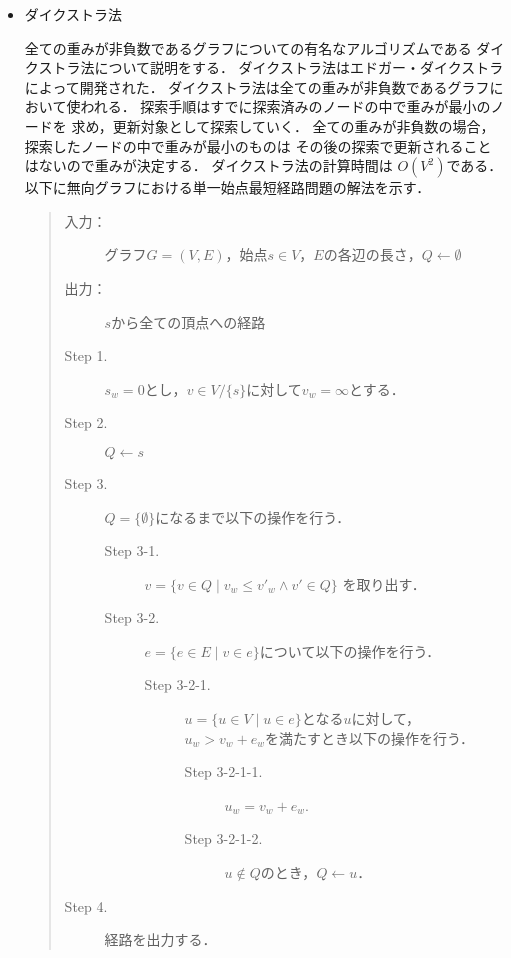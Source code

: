 \documentclass[12pt]{optlab-bachelor}
\begin{document}
\begin{itemize}
  \item ダイクストラ法

  全ての重みが非負数であるグラフについての有名なアルゴリズムである
  ダイクストラ法について説明をする．
  ダイクストラ法はエドガー・ダイクストラ\cite{Dijkstera}によって開発された．
  ダイクストラ法は全ての重みが非負数であるグラフにおいて使われる．
  探索手順はすでに探索済みのノードの中で重みが最小のノードを
  求め，更新対象として探索していく．
  全ての重みが非負数の場合，探索したノードの中で重みが最小のものは
  その後の探索で更新されることはないので重みが決定する．
  ダイクストラ法の計算時間は $O(V^2)$である．
  以下に無向グラフにおける単一始点最短経路問題の解法を示す．

  \begin{quote}
    \begin{description}
      \item[入力：] グラフ$G=(V,E)$，始点$s \in V$，$E$の各辺の長さ，$Q \leftarrow \emptyset$
      \item[出力：] $s$から全ての頂点への経路
      \item[Step 1.] $s_w = 0$とし，$v \in V/ \{ s\}$に対して$v_w = \infty$とする．
      \item[Step 2.] $Q \leftarrow s$
      \item[Step 3.] $Q = \{\emptyset\}$になるまで以下の操作を行う．
      \begin{description}
        \item[Step 3-1.] $v = \{ v \in Q \mid v_w \leq v'_w \land v' \in Q \}$
        を取り出す．
        \item[Step 3-2.] $e = \{ e \in E \mid v \in e \}$について以下の操作を行う．

        \begin{description}
          \item[Step 3-2-1.] $u = \{ u \in V \mid u \in e\}$となる$u$に対して，
          $u_w > v_w + e_w$を満たすとき以下の操作を行う．

          \begin{description}
            \item[Step 3-2-1-1.] $u_w = v_w + e_w$.
            \item[Step 3-2-1-2.] $u \notin Q$のとき，$Q \leftarrow u$．
          \end{description}
        \end{description}
      \end{description}

      \item[Step 4.] 経路を出力する．
    \end{description}
  \end{quote}
\end{itemize}
\end{document}
